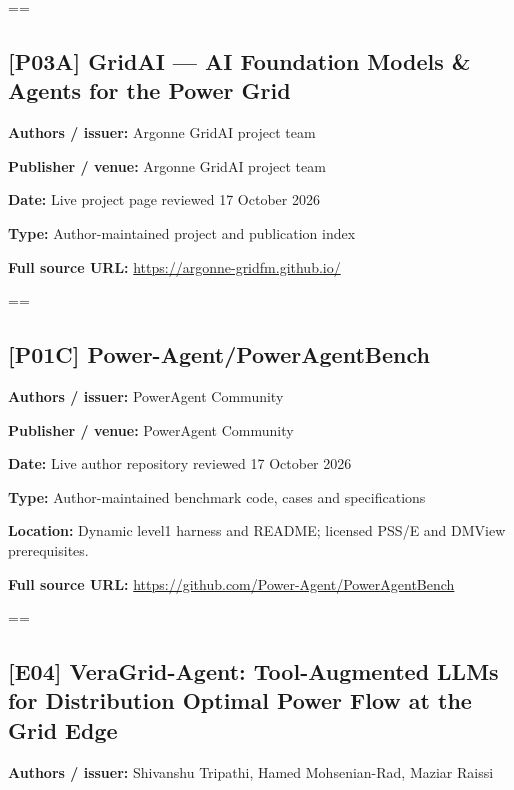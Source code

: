 \documentclass[10pt,letterpaper]{article}
\begin{document}
\setbox\readingEntry=\vbox\bgroup\hsize=\linewidth\subsection*{[P03A] GridAI --- AI Foundation Models \& Agents for the Power Grid}
\textbf{Authors / issuer:} Argonne GridAI project team\par
\textbf{Publisher / venue:} Argonne GridAI project team\par
\textbf{Date:} Live project page reviewed 17 October 2026\par
\textbf{Type:} Author-maintained project and publication index\par
\textbf{Full source URL:} \href{https://argonne-gridfm.github.io/}{\small\ttfamily https:/\allowbreak{}/\allowbreak{}argonne-\allowbreak{}gridfm.\allowbreak{}github.\allowbreak{}io/\allowbreak{}}\par
\egroup\par\noindent\box\readingEntry\par\medskip
\setbox\readingEntry=\vbox\bgroup\hsize=\linewidth\subsection*{[P01C] Power-Agent/PowerAgentBench}
\textbf{Authors / issuer:} PowerAgent Community\par
\textbf{Publisher / venue:} PowerAgent Community\par
\textbf{Date:} Live author repository reviewed 17 October 2026\par
\textbf{Type:} Author-maintained benchmark code, cases and specifications\par
\textbf{Location:} Dynamic level1 harness and README; licensed PSS/E and DMView prerequisites.\par
\textbf{Full source URL:} \href{https://github.com/Power-Agent/PowerAgentBench}{\small\ttfamily https:/\allowbreak{}/\allowbreak{}github.\allowbreak{}com/\allowbreak{}Power-\allowbreak{}Agent/\allowbreak{}PowerAgentBench}\par
\egroup\par\noindent\box\readingEntry\par\medskip
\setbox\readingEntry=\vbox\bgroup\hsize=\linewidth\subsection*{[E04] VeraGrid-Agent: Tool-Augmented LLMs for Distribution Optimal Power Flow at the Grid Edge}
\textbf{Authors / issuer:} Shivanshu Tripathi, Hamed Mohsenian-Rad, Maziar Raissi\par
\end{document}

